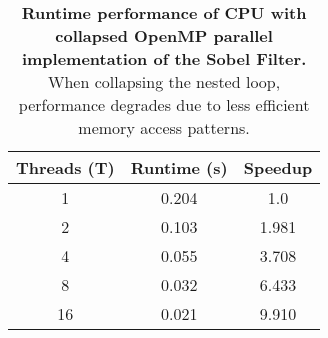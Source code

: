 \begin{table}[htbp]
    \centering
    \begin{tabular}{c|cc}
        Threads (T) & Runtime (s) & Speedup \\
        \hline
        1 & 0.204 & 1.0 \\
        2 & 0.103 & 1.981 \\
        4 & 0.055 & 3.708 \\
        8 & 0.032 & 6.433 \\
        16 & 0.021 & 9.910 \\
    \end{tabular}
    \caption{\textbf{Runtime performance of CPU with collapsed OpenMP parallel implementation of the Sobel Filter.} When collapsing the nested loop, performance degrades due to less efficient memory access patterns.}
    \label{tab:cpu-omp-collapsed}
\end{table}